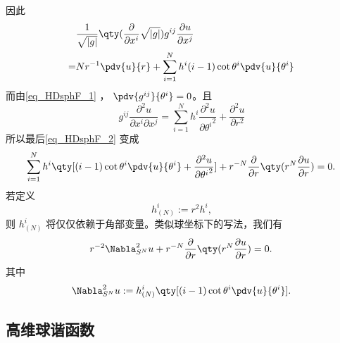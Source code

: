 因此
\begin{equation}
\begin{aligned}
&\frac{1}{\sqrt{ \left\lvert g \right\rvert }} \qty(\frac{\partial }{\partial x^i} \sqrt{ \left\lvert g \right\rvert })g^{ij} \frac{\partial u}{\partial x^j}\\
=&Nr^{-1}\pdv{u}{r}+\sum_{i=1}^{N}h^{i}(i-1)\cot\theta^i\pdv{u}{\theta^i}\\
\end{aligned}~
\end{equation}
而由\autoref{eq_HDsphF_1} ， $\pdv{g^{ij}}{\theta^i}=0$。且
\begin{equation}
g^{ij}\frac{\partial^2 u}{\partial x^i\partial x^j}=\sum_{i=1}^{N}h^{i}\frac{\partial^2 u}{\partial {\theta^i}^2}+\frac{\partial^2 u}{\partial r^2}~
\end{equation}
所以最后\autoref{eq_HDsphF_2} 变成
\begin{equation}
\begin{aligned}
\sum_{i=1}^{N}h^{i}\qty[(i-1)\cot\theta^i\pdv{u}{\theta^i}+\frac{\partial^2 u}{\partial {\theta^i}^2}]+r^{-N}\frac{\partial }{\partial r}\qty(r^{N}\frac{\partial u}{\partial r})=0.
\end{aligned}~
\end{equation}
若定义 
\begin{equation}
h^i_{(N)}:=r^2h^i,~
\end{equation}
则 $h^i_{(N)}$ 将仅仅依赖于角部变量。类似球坐标下的写法，我们有
\begin{equation}
r^{-2}\Nabla^{2}_{S^N}u+r^{-N}\frac{\partial }{\partial r}\qty(r^{N}\frac{\partial u}{\partial r})=0.~
\end{equation}
其中
\begin{equation}
\Nabla^{2}_{S^N}u:=h^{i}_{(N)}\qty[(i-1)\cot\theta^i\pdv{u}{\theta^i}].~
\end{equation}

\subsection{高维球谐函数}










